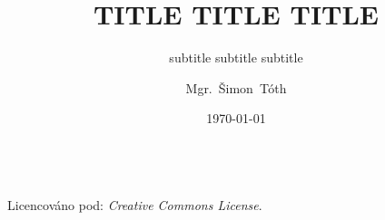 

\title{TITLE TITLE TITLE}
\subtitle{subtitle subtitle subtitle}
\author[]{Mgr.~Šimon~Tóth}
\date{\today}

\newcommand{\CcNote}[1]{%
        Licencováno pod: \textit{Creative Commons #1 3.0 License}.%
}


	\begin{frame}
		\titlepage
		\vfill
		\begin{center}
			\\
			{\tiny\CcNote{\CcLongnameByNcSa}}
			\vspace*{2ex}
		\end{center}
	\end{frame}




